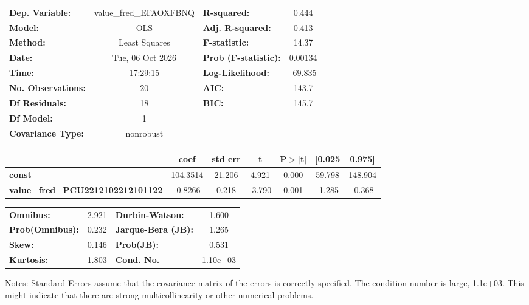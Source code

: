 \begin{center}
\begin{tabular}{lclc}
\toprule
\textbf{Dep. Variable:}                   & value\_fred\_EFAOXFBNQ & \textbf{  R-squared:         } &     0.444   \\
\textbf{Model:}                           &          OLS           & \textbf{  Adj. R-squared:    } &     0.413   \\
\textbf{Method:}                          &     Least Squares      & \textbf{  F-statistic:       } &     14.37   \\
\textbf{Date:}                            &    Tue, 06 Oct 2026    & \textbf{  Prob (F-statistic):} &  0.00134    \\
\textbf{Time:}                            &        17:29:15        & \textbf{  Log-Likelihood:    } &   -69.835   \\
\textbf{No. Observations:}                &             20         & \textbf{  AIC:               } &     143.7   \\
\textbf{Df Residuals:}                    &             18         & \textbf{  BIC:               } &     145.7   \\
\textbf{Df Model:}                        &              1         & \textbf{                     } &             \\
\textbf{Covariance Type:}                 &       nonrobust        & \textbf{                     } &             \\
\bottomrule
\end{tabular}
\begin{tabular}{lcccccc}
                                          & \textbf{coef} & \textbf{std err} & \textbf{t} & \textbf{P$> |$t$|$} & \textbf{[0.025} & \textbf{0.975]}  \\
\midrule
\textbf{const}                            &     104.3514  &       21.206     &     4.921  &         0.000        &       59.798    &      148.904     \\
\textbf{value\_fred\_PCU2212102212101122} &      -0.8266  &        0.218     &    -3.790  &         0.001        &       -1.285    &       -0.368     \\
\bottomrule
\end{tabular}
\begin{tabular}{lclc}
\textbf{Omnibus:}       &  2.921 & \textbf{  Durbin-Watson:     } &    1.600  \\
\textbf{Prob(Omnibus):} &  0.232 & \textbf{  Jarque-Bera (JB):  } &    1.265  \\
\textbf{Skew:}          &  0.146 & \textbf{  Prob(JB):          } &    0.531  \\
\textbf{Kurtosis:}      &  1.803 & \textbf{  Cond. No.          } & 1.10e+03  \\
\bottomrule
\end{tabular}
\end{center}

Notes: \newline
 [1] Standard Errors assume that the covariance matrix of the errors is correctly specified. \newline
 [2] The condition number is large, 1.1e+03. This might indicate that there are \newline
 strong multicollinearity or other numerical problems.